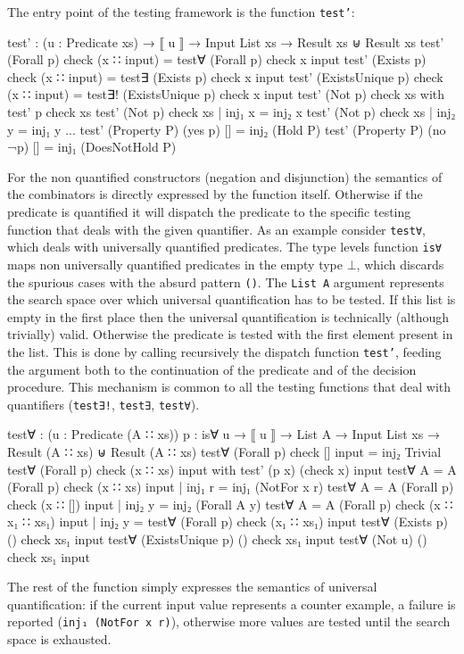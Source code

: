 \documentclass[10pt,a4paper]{article}
\begin{document}
The entry point of the testing framework is the function \texttt{test'}:
\begin{code}
test' : (u : Predicate xs) → ⟦ u ⟧ → Input List xs → Result xs ⊎ Result xs
test' (Forall p) check (x ∷ input) = test∀ (Forall p) check x input
test' (Exists p) check (x ∷ input) = test∃ (Exists p) check x input
test' (ExistsUnique p) check (x ∷ input) = test∃! (ExistsUnique p) check x input
test' (Not p) check xs with test' p check xs
test' (Not p) check xs | inj₁ x = inj₂ x
test' (Not p) check xs | inj₂ y = inj₁ y 
...
test' (Property P) (yes p) [] = inj₂ (Hold P)
test' (Property P) (no ¬p) [] = inj₁ (DoesNotHold P)
\end{code}
For the non quantified constructors (negation and disjunction) the semantics of the combinators is directly expressed by the function itself.
Otherwise if the predicate is quantified it will dispatch the predicate to the specific testing function that deals with the given quantifier.
As an example consider \texttt{test∀}, which deals with universally quantified predicates.
The type levels function \texttt{is∀} maps non universally quantified predicates in the empty type \texttt{$\bot$}, which discards the spurious cases with the  absurd pattern \texttt{()}.
The \texttt{List A} argument represents the search space over which universal quantification has to be tested.
If this list is empty in the first place then the universal quantification is technically (although trivially) valid. Otherwise the predicate is tested with the first element present in the list. This is done by calling recursively the dispatch function \texttt{test'}, feeding the argument both to the continuation of the predicate and of the decision procedure. This mechanism is common to all the testing functions that deal with quantifiers (\texttt{test∃!}, \texttt{test∃}, \texttt{test∀}). 	
\begin{code}
test∀ : (u : Predicate (A ∷ xs)) {p : is∀ u} → ⟦ u ⟧ → List A → 
         Input List xs → Result (A ∷ xs) ⊎ Result (A ∷ xs)
test∀ (Forall p) check [] input = inj₂ Trivial
test∀ (Forall p) check (x ∷ xs) input with test' (p x) (check x) input
test∀ {A = A} (Forall p) check (x ∷ xs) input | inj₁ r = inj₁ (NotFor x r)
test∀ {A = A} (Forall p) check (x ∷ []) input | inj₂ y = inj₂ (Forall A y)
test∀ {A = A} (Forall p) check (x ∷ x₁ ∷ xs₁) input | inj₂ y = 
	test∀ (Forall p) check (x₁ ∷ xs₁) input
test∀ (Exists p) {()} check xs₁ input
test∀ (ExistsUnique p) {()} check xs₁ input
test∀ (Not u) {()} check xs₁ input
\end{code}
The rest of the function simply expresses the semantics of universal quantification: if the current input value represents a counter example, a failure is reported
(\texttt{inj₁ (NotFor x r)}), otherwise more values are tested until the search space is exhausted.
\end{document}
